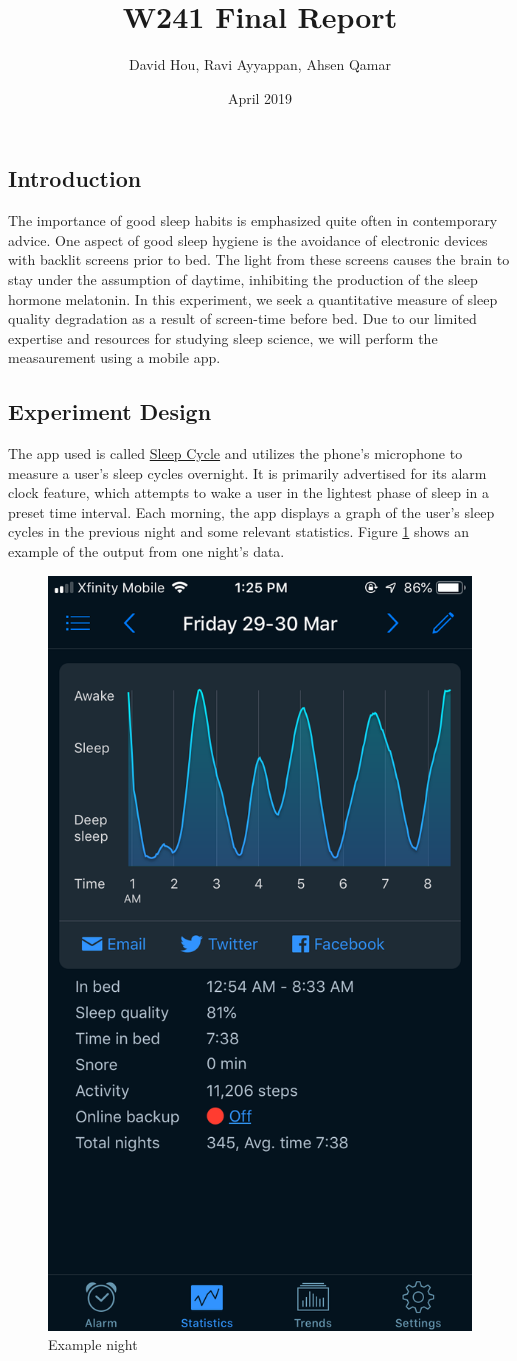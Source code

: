 \documentclass[]{article}
\title{W241 Final Report}
\author{David Hou, Ravi Ayyappan, Ahsen Qamar}
\date{April 2019}
\begin{document}
\maketitle

\subsection{Introduction}\label{introduction}

The importance of good sleep habits is emphasized quite often in
contemporary advice. One aspect of good sleep hygiene is the avoidance
of electronic devices with backlit screens prior to bed. The light from
these screens causes the brain to stay under the assumption of daytime,
inhibiting the production of the sleep hormone melatonin. In this
experiment, we seek a quantitative measure of sleep quality degradation
as a result of screen-time before bed. Due to our limited expertise and
resources for studying sleep science, we will perform the measaurement
using a mobile app.

\subsection{Experiment Design}\label{experiment-design}

The app used is called \href{www.sleepcycle.com}{Sleep Cycle} and
utilizes the phone's microphone to measure a user's sleep cycles
overnight. It is primarily advertised for its alarm clock feature, which
attempts to wake a user in the lightest phase of sleep in a preset time
interval. Each morning, the app displays a graph of the user's sleep
cycles in the previous night and some relevant statistics. Figure
\ref{fig:example_night} shows an example of the output from one night's
data.

\begin{figure}[H]

{\centering \includegraphics[width=0.25\linewidth]{img/example_night} 

}

\caption{Example night}\label{fig:example_night}
\end{figure}
\end{document}
